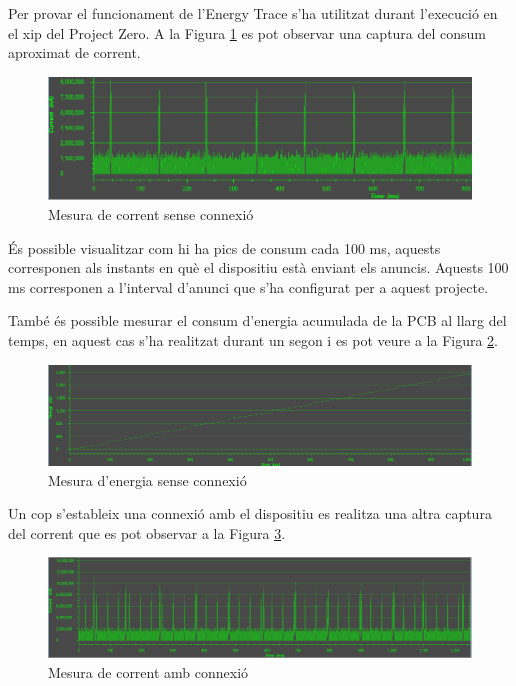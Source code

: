 Per provar el funcionament de l'Energy Trace s'ha utilitzat durant l'execució en el xip del Project Zero.
A la Figura \ref{energy_trace1} es pot observar una captura del consum aproximat de corrent.

\begin{figure}[!h]
	\begin{center}
		\includegraphics[width=\textwidth]{./images/consum_energia_no_connected_current2.png}
		\caption{Mesura de corrent sense connexió}
		\label{energy_trace1}
	\end{center}
\end{figure}

És possible visualitzar com hi ha pics de consum cada 100 ms, aquests corresponen als instants en què el dispositiu està enviant els anuncis.
Aquests 100 ms corresponen a l'interval d'anunci que s'ha configurat per a aquest projecte.

També és possible mesurar el consum d'energia acumulada de la PCB al llarg del temps, en aquest cas s'ha realitzat durant un segon i es pot veure a la Figura \ref{energy_measure}.

\begin{figure}[!h]
	\begin{center}
		\includegraphics[width=\textwidth]{./images/consum_energia_no_connected_energia.PNG}
		\caption{Mesura d'energia sense connexió}
		\label{energy_measure}
	\end{center}
\end{figure}

Un cop s'estableix una connexió amb el dispositiu es realitza una altra captura del corrent que es pot observar a la Figura \ref{energy_trace_connection}.

\begin{figure}[!h]
	\begin{center}
		\includegraphics[width=\textwidth]{./images/consum_energia_connected_current.png}
		\caption{Mesura de corrent amb connexió}
		\label{energy_trace_connection}
	\end{center}
\end{figure}

